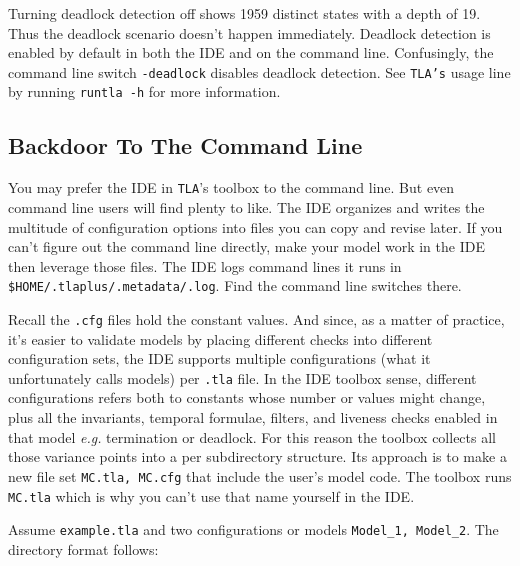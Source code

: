 \documentclass[twocolumn]{article}
\begin{document}
Turning deadlock detection off shows 1959 distinct states with a depth of 19. Thus the deadlock scenario doesn't happen immediately. Deadlock detection is enabled by default in both the IDE and on the command line. Confusingly, the command line switch \texttt{-deadlock} disables deadlock detection. See \texttt{TLA's} usage line by running \texttt{runtla -h} for more information.

\subsection{Backdoor To The Command Line}
You may prefer the IDE in \texttt{TLA}'s toolbox to the command line. But even command line users will find plenty to like. The IDE organizes and writes the multitude of configuration options into files you can copy and revise later. If you can't figure out the command line directly, make your model work in the IDE then leverage those files. The IDE logs command lines it runs in \texttt{\$HOME/.tlaplus/.metadata/.log}. Find the command line switches there.

Recall the \texttt{.cfg} files hold the constant values. And since, as a matter of practice, it's easier to validate models by placing different checks into different configuration sets, the IDE supports multiple configurations (what it unfortunately calls models) per \texttt{.tla} file. In the IDE toolbox sense, different configurations refers both to constants whose number or values might change, plus all the invariants, temporal formulae, filters, and liveness checks enabled in that model \emph{e.g.} termination or deadlock. For this reason the toolbox collects all those variance points into a per subdirectory structure. Its approach is to make a new file set \texttt{MC.tla, MC.cfg} that include the user's model code. The toolbox runs \texttt{MC.tla} which is why you can't use that name yourself in the IDE.

Assume \texttt{example.tla} and two configurations or models \texttt{Model\_1, Model\_2}. The directory format follows:
\end{document}
